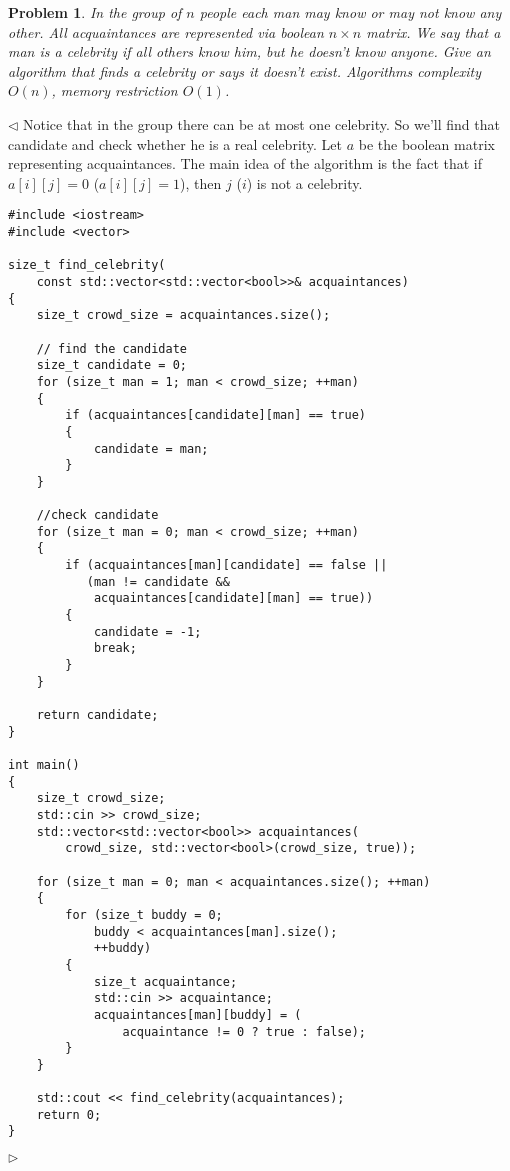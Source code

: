 \documentclass[12pt]{article}
\newtheorem{problem}{Problem}[subsection]
\newenvironment{solution}{\par $\triangleleft$}{$\triangleright$}
\begin{document}
\begin{problem} In the group of $n$ people each man may know or may not know any
other. All acquaintances are represented via boolean $n\times n$ matrix. We say
that a man is a celebrity if all others know him, but he doesn't know anyone.
Give an algorithm that finds a celebrity or says it doesn't exist. Algorithms
complexity $O(n)$, memory restriction $O(1)$.
\end{problem}
\begin{solution} Notice that in the group there can be at most one celebrity. So
    we'll find that candidate and check whether he is a real celebrity. Let $a$
    be the boolean matrix representing acquaintances. The main idea of the
    algorithm is the fact that if $a[i][j]=0$ ($a[i][j]=1$), then $j$ ($i$) is
    not a celebrity.
    \begin{verbatim}
#include <iostream>
#include <vector>

size_t find_celebrity(
    const std::vector<std::vector<bool>>& acquaintances)
{
    size_t crowd_size = acquaintances.size();

    // find the candidate
    size_t candidate = 0;
    for (size_t man = 1; man < crowd_size; ++man)
    {
        if (acquaintances[candidate][man] == true)
        {
            candidate = man;
        }
    }

    //check candidate
    for (size_t man = 0; man < crowd_size; ++man)
    {
        if (acquaintances[man][candidate] == false ||
           (man != candidate &&
            acquaintances[candidate][man] == true))
        {
            candidate = -1;
            break;
        }
    }

    return candidate;
}

int main()
{
    size_t crowd_size;
    std::cin >> crowd_size;
    std::vector<std::vector<bool>> acquaintances(
        crowd_size, std::vector<bool>(crowd_size, true));

    for (size_t man = 0; man < acquaintances.size(); ++man)
    {
        for (size_t buddy = 0;
            buddy < acquaintances[man].size();
            ++buddy)
        {
            size_t acquaintance;
            std::cin >> acquaintance;
            acquaintances[man][buddy] = (
                acquaintance != 0 ? true : false);
        }
    }

    std::cout << find_celebrity(acquaintances);
    return 0;
}
    \end{verbatim}
\end{solution}
\end{document}
